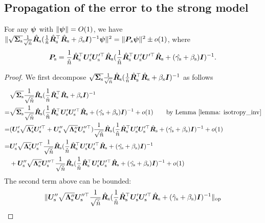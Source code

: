 \subsection{Propagation of the error to the strong model}\label{apdx: error_propogation}


\begin{lemma}\label{lemma: propagation_strong}
 For any ${\bm{\psi}}$ with $\| {\bm{\psi}} \|=O(1)$, we have $  \|  \sqrt{{\bm{\Sigma}}_{\text{s}}} \frac{1}{\sqrt{\hat{n}}}\hat{{\bm{R}}}_{\text{s}} ( \frac{1}{\hat{n}}\hat{{\bm{R}}}_{\text{s}}^\top \hat{{\bm{R}}}_{\text{s}} +\beta_{\text{s}} {\bm{I}} )^{-1} {\bm{\psi}} \|^2 = \| {\bm{P}}_s {\bm{\psi}} \|^2 \pm o(1)$, where
 $$
  {\bm{P}}_{\text{s}} = \frac{1}{\hat{n}}\hat{{\bm{R}}}_{\text{s}}^\top {\bm{U}}_{\text{s}}'{\bm{U}}_{\text{s}}'^\top \hat{{\bm{R}}}_{\text{s}} ( \frac{1}{\hat{n}}\hat{{\bm{R}}}_{\text{s}}^\top{\bm{U}}_{\text{s}}'{\bm{U}}'^\top\hat{{\bm{R}}}_{\text{s}} + (\hat{\gamma_{\text{s}}}+\beta_{\text{s}}){\bm{I}} )^{-1}.
 $$
\end{lemma}
\begin{proof}
We first decompose $\sqrt{{\bm{\Sigma}}_{\text{s}}} \frac{1}{\sqrt{\hat{n}}}\hat{{\bm{R}}}_{\text{s}} ( \frac{1}{\hat{n}}\hat{{\bm{R}}}_{\text{s}}^\top \hat{{\bm{R}}}_{\text{s}} +\beta_{\text{s}} {\bm{I}} )^{-1}$ as follows
\begin{align}
\nonumber
    &\sqrt{{\bm{\Sigma}}_{\text{s}}} \frac{1}{\sqrt{\hat{n}}}\hat{{\bm{R}}}_{\text{s}} ( \frac{1}{\hat{n}}\hat{{\bm{R}}}_{\text{s}}^\top \hat{{\bm{R}}}_{\text{s}} +\beta_{\text{s}} {\bm{I}} )^{-1} \\
    \nonumber
    = &\sqrt{{\bm{\Sigma}}_{\text{s}}} \frac{1}{\sqrt{\hat{n}}}\hat{{\bm{R}}}_{\text{s}}   ( \frac{1}{\hat{n}}\hat{{\bm{R}}}_{\text{s}}^\top{\bm{U}}_{\text{s}}'{\bm{U}}_{\text{s}}'^\top\hat{{\bm{R}}}_{\text{s}} + (\hat{\gamma_{\text{s}}}+\beta_{\text{s}}){\bm{I}}  )^{-1} + o(1) \quad\quad\text{by Lemma \ref{lemma: isotropy_inv}}
\\
\nonumber
 = &  ({\bm{U}}_{\text{s}}' \sqrt{{\bm{\Lambda}}_{\text{s}}'} {\bm{U}}_{\text{s}}'^\top + {\bm{U}}_{\text{s}}'' \sqrt{{\bm{\Lambda}}_{\text{s}}''} {\bm{U}}_{\text{s}}''^\top) \frac{1}{\sqrt{\hat{n}}}\hat{{\bm{R}}}_{\text{s}}   ( \frac{1}{\hat{n}}\hat{{\bm{R}}}_{\text{s}}^\top{\bm{U}}_{\text{s}}'{\bm{U}}_{\text{s}}'^\top\hat{{\bm{R}}}_{\text{s}} + (\hat{\gamma_{\text{s}}}+\beta_{\text{s}}){\bm{I}}  )^{-1} + o(1)\\
\nonumber
 = & {\bm{U}}_{\text{s}}' \sqrt{{\bm{\Lambda}}_{\text{s}}'} {\bm{U}}_{\text{s}}'^\top  \frac{1}{\sqrt{\hat{n}}}\hat{{\bm{R}}}_{\text{s}}   ( \frac{1}{\hat{n}}\hat{{\bm{R}}}_{\text{s}}^\top{\bm{U}}_{\text{s}}'{\bm{U}}_{\text{s}}'^\top\hat{{\bm{R}}}_{\text{s}} + (\hat{\gamma_{\text{s}}}+\beta_{\text{s}}){\bm{I}}  )^{-1} \\
\label{eq: strong_transform_decomp}
& + {\bm{U}}_{\text{s}}'' \sqrt{{\bm{\Lambda}}_{\text{s}}''} {\bm{U}}_{\text{s}}''^\top \frac{1}{\sqrt{\hat{n}}}\hat{{\bm{R}}}_{\text{s}}   ( \frac{1}{\hat{n}}\hat{{\bm{R}}}_{\text{s}}^\top{\bm{U}}_{\text{s}}'{\bm{U}}_{\text{s}}'^\top\hat{{\bm{R}}}_{\text{s}} + (\hat{\gamma_{\text{s}}}+\beta_{\text{s}}){\bm{I}}  )^{-1} + o(1)
\end{align}
The second term above can be bounded:
\begin{align}
    \nonumber
   & \opnorm{ \mU_\s'' \sqrt{\mLambda_\s''} \mU_\s''^\top  \frac{1}{\sqrt{\hat{n}}}\hat{\mR}_\s   ( \frac{1}{\hat{n}}\hat{\mR}_\s^\top\mU_\s'\mU_\s'^\top\hat{\mR}_\s + (\hat{\gamma}_\s+\beta_\s)\mI  )^{-1} } \\

\end{align}
\end{proof}
